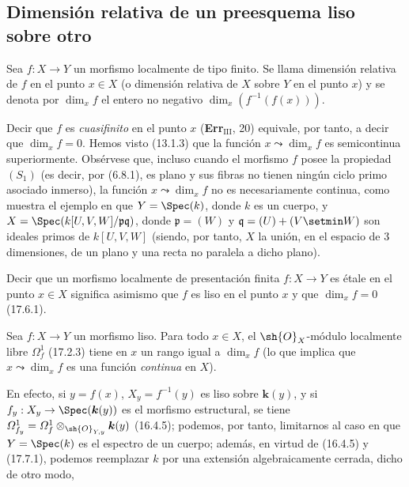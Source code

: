 \subsection{Dimensión relativa de un preesquema liso sobre otro}
\label{subsection:IV.17.10}

\begin{definition}[17.10.1]
\label{IV.17.10.1}
Sea $f:X\to Y$ un morfismo localmente de tipo finito. Se llama dimensión relativa de $f$ en el punto $x\in X$ (o dimensión relativa de $X$ sobre $Y$ en el punto $x$) y se denota por $\dim_x f$ el entero no negativo $\dim_x(f^{-1}(f(x)))$.
\end{definition}

Decir que $f$ es \emph{cuasifinito} en el punto $x$ (\textbf{Err}$_{\mathrm{III}}$, 20) equivale, por tanto, a decir que $\dim_x f=0$. Hemos visto (13.1.3) que la función $x\leadsto\dim_x f$ es semicontinua superiormente. Obsérvese que, incluso cuando el morfismo $f$ posee la propiedad $(S_1)$ (es decir, por (6.8.1), es plano y sus fibras no tienen ningún ciclo primo asociado inmerso), la función $x\leadsto\dim_x f$ no es necesariamente continua, como muestra el ejemplo en que $Y=\Spec(k)$, donde $k$ es un cuerpo, y $X=\Spec(k[U,V,W]/\mathfrak p\mathfrak q)$, donde $\mathfrak p=(W)$ y $\mathfrak q=(U)+(V\setmin W)$ son ideales primos de $k[U,V,W]$ (siendo, por tanto, $X$ la unión, en el espacio de 3 dimensiones, de un plano y una recta no paralela a dicho plano).

Decir que un morfismo localmente de presentación finita $f:X\to Y$ es étale en el punto $x\in X$ significa asimismo que $f$ es liso en el punto $x$ y que $\dim_x f=0$ (17.6.1).

\begin{proposition}[17.10.2]
\label{IV.17.10.2}
Sea $f:X\to Y$ un morfismo liso. Para todo $x\in X$, el $\sh{O}_X$-módulo localmente libre $\varOmega_f^1$ \textup{(17.2.3)} tiene en $x$ un rango igual a $\dim_x f$ \textup{(lo que implica que $x\leadsto\dim_x f$ es una función \emph{continua} en $X$)}.
\end{proposition}

En efecto, si $y=f(x)$, $X_y=f^{-1}(y)$ es liso sobre $\boldsymbol k(y)$, y si $f_y:X_y\to\Spec(\boldsymbol k(y))$ es el morfismo estructural, se tiene $\varOmega_{f_y}^1=\varOmega_f^1\otimes_{\sh{O}_{Y,y}}\boldsymbol k(y)$ (16.4.5); podemos, por tanto, limitarnos al caso en que $Y=\Spec(k)$ es el espectro de un cuerpo; además, en virtud de (16.4.5) y (17.7.1), podemos reemplazar $k$ por una extensión algebraicamente cerrada, dicho de otro modo,

